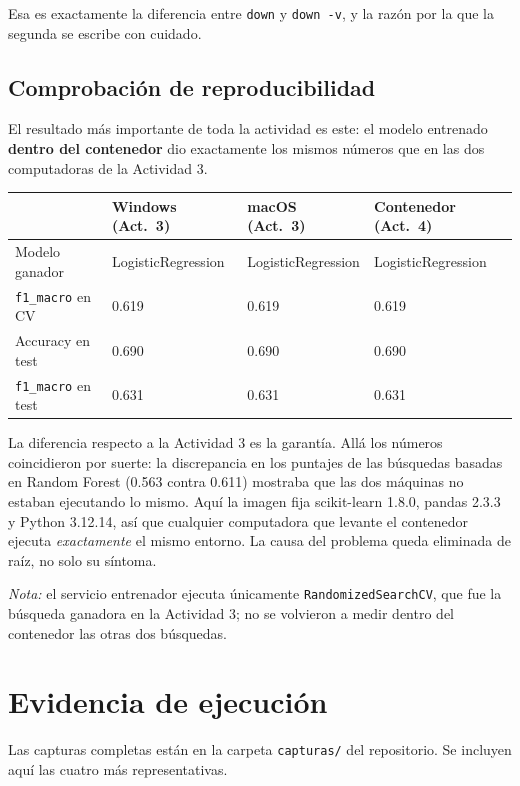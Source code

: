 \documentclass[12pt,a4paper]{article}
\begin{document}
Esa es exactamente la diferencia entre \texttt{down} y \texttt{down -v}, y la raz\'on por la que
la segunda se escribe con cuidado.

\subsection{Comprobaci\'on de reproducibilidad}

El resultado m\'as importante de toda la actividad es este: el modelo entrenado \textbf{dentro del
contenedor} dio exactamente los mismos n\'umeros que en las dos computadoras de la Actividad 3.

\begin{center}
\begin{tabular}{|l|l|l|l|}
\hline
& \textbf{Windows (Act.\ 3)} & \textbf{macOS (Act.\ 3)} & \textbf{Contenedor (Act.\ 4)} \\
\hline
Modelo ganador & LogisticRegression & LogisticRegression & LogisticRegression \\
\texttt{f1\_macro} en CV & 0.619 & 0.619 & 0.619 \\
Accuracy en test & 0.690 & 0.690 & 0.690 \\
\texttt{f1\_macro} en test & 0.631 & 0.631 & 0.631 \\
\hline
\end{tabular}
\end{center}

La diferencia respecto a la Actividad 3 es la garant\'ia. All\'a los n\'umeros coincidieron por
suerte: la discrepancia en los puntajes de las b\'usquedas basadas en Random Forest (0.563 contra
0.611) mostraba que las dos m\'aquinas no estaban ejecutando lo mismo. Aqu\'i la imagen fija
scikit-learn 1.8.0, pandas 2.3.3 y Python 3.12.14, as\'i que cualquier computadora que levante el
contenedor ejecuta \emph{exactamente} el mismo entorno. La causa del problema queda eliminada de
ra\'iz, no solo su s\'intoma.

\emph{Nota:} el servicio entrenador ejecuta \'unicamente \texttt{RandomizedSearchCV}, que fue la
b\'usqueda ganadora en la Actividad 3; no se volvieron a medir dentro del contenedor las otras dos
b\'usquedas.

\section{Evidencia de ejecuci\'on}

Las capturas completas est\'an en la carpeta \texttt{capturas/} del repositorio. Se incluyen aqu\'i
las cuatro m\'as representativas.
\end{document}
